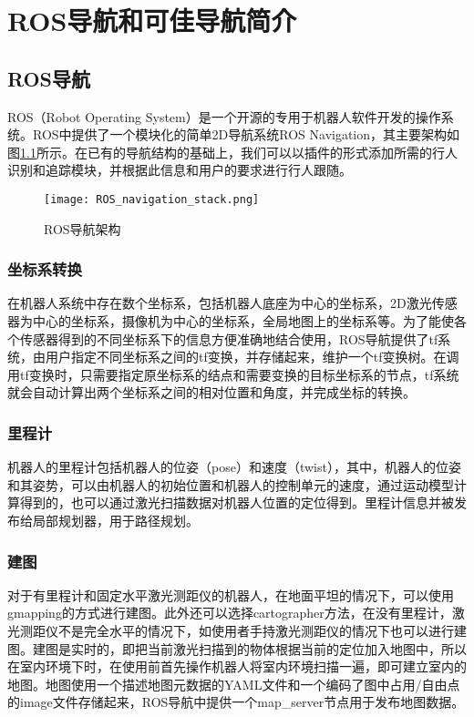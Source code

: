 
\chapter{ROS导航和可佳导航简介}

\section{ROS导航}

ROS（Robot Operating System）是一个开源的专用于机器人软件开发的操作系统。ROS中提供了一个模块化的简单2D导航系统ROS Navigation，其主要架构如图\ref{fig:rosnav}所示。在已有的导航结构的基础上，我们可以以插件的形式添加所需的行人识别和追踪模块，并根据此信息和用户的要求进行行人跟随。

\begin{figure}[htb]
  \centering
  \texttt{[image: ROS\_navigation\_stack.png]}
  \caption{ROS导航架构}
  \label{fig:rosnav}
\end{figure}

\subsection{坐标系转换}
  在机器人系统中存在数个坐标系，包括机器人底座为中心的坐标系，2D激光传感器为中心的坐标系，摄像机为中心的坐标系，全局地图上的坐标系等。为了能使各个传感器得到的不同坐标系下的信息方便准确地结合使用，ROS导航提供了tf系统，由用户指定不同坐标系之间的tf变换，并存储起来，维护一个tf变换树。在调用tf变换时，只需要指定原坐标系的结点和需要变换的目标坐标系的节点，tf系统就会自动计算出两个坐标系之间的相对位置和角度，并完成坐标的转换。

\subsection{里程计}
  机器人的里程计包括机器人的位姿（pose）和速度（twist），其中，机器人的位姿和其姿势，可以由机器人的初始位置和机器人的控制单元的速度，通过运动模型计算得到的，也可以通过激光扫描数据对机器人位置的定位得到。里程计信息并被发布给局部规划器，用于路径规划。

\subsection{建图}
  对于有里程计和固定水平激光测距仪的机器人，在地面平坦的情况下，可以使用gmapping\cite{grisetti2007improved}的方式进行建图。此外还可以选择cartographer\cite{hess2016real}方法，在没有里程计，激光测距仪不是完全水平的情况下，如使用者手持激光测距仪的情况下也可以进行建图。建图是实时的，即把当前激光扫描到的物体根据当前的定位加入地图中，所以在室内环境下时，在使用前首先操作机器人将室内环境扫描一遍，即可建立室内的地图。地图使用一个描述地图元数据的YAML文件和一个编码了图中占用/自由点的image文件存储起来，ROS导航中提供一个map\_server节点用于发布地图数据。

